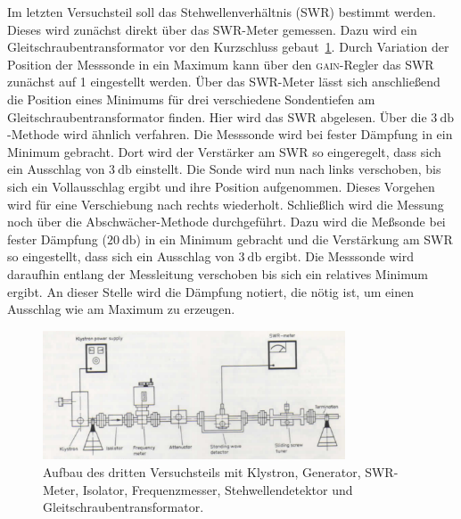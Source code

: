Im letzten Versuchsteil soll das Stehwellenverhältnis (SWR) bestimmt werden.
Dieses wird zunächst direkt über das SWR-Meter gemessen.
Dazu wird ein Gleitschraubentransformator vor den Kurzschluss gebaut~\ref{fig:aufbau3}.
Durch Variation der Position der Messsonde in ein Maximum kann über den \textsc{gain}-Regler das SWR zunächst auf 1 eingestellt werden.
Über das SWR-Meter lässt sich anschließend die Position eines Minimums für drei verschiedene Sondentiefen am Gleitschraubentransformator finden.
Hier wird das SWR abgelesen.
Über die $\SI{3}{\decibel}$-Methode wird ähnlich verfahren.
Die Messsonde wird bei fester Dämpfung in ein Minimum gebracht.
Dort wird der Verstärker am SWR so eingeregelt, dass sich ein Ausschlag von $\SI{3}{\decibel}$ einstellt.
Die Sonde wird nun nach links verschoben, bis sich ein Vollausschlag ergibt und ihre Position aufgenommen.
Dieses Vorgehen wird für eine Verschiebung nach rechts wiederholt.
Schließlich wird die Messung noch über die Abschwächer-Methode durchgeführt.
Dazu wird die Meßsonde bei fester Dämpfung ($\SI{20}{\decibel}$) in ein Minimum gebracht und die Verstärkung am SWR so eingestellt, dass sich ein Ausschlag von $\SI{3}{\decibel}$ ergibt.
Die Messsonde wird daraufhin entlang der Messleitung verschoben bis sich ein relatives Minimum ergibt.
An dieser Stelle wird die Dämpfung notiert, die nötig ist, um einen Ausschlag wie am Maximum zu erzeugen.

\begin{figure}[h]
    \centering
    \includegraphics[width=0.8\textwidth]{figure/Aufbau_3.PNG}
    \caption{Aufbau des dritten Versuchsteils mit Klystron, Generator, SWR-Meter, Isolator, Frequenzmesser, Stehwellendetektor und Gleitschraubentransformator.\cite{V53}}
    \label{fig:aufbau3}
\end{figure}
